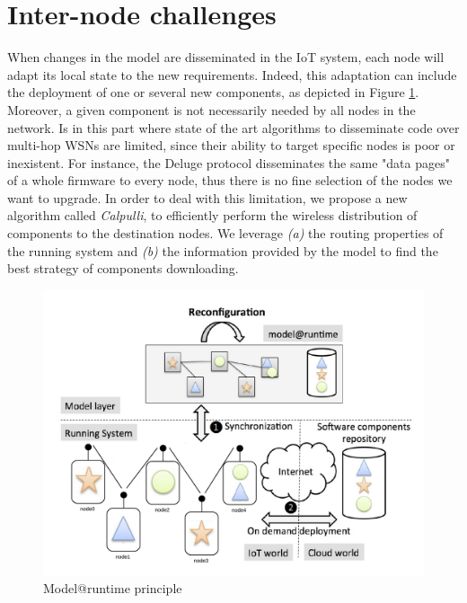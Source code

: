 \section{Inter-node challenges}
When changes in the model are disseminated in the IoT system, each node will adapt its local state to the new requirements. 
Indeed, this adaptation can include the deployment of one or several new components, as depicted in Figure \ref{fig:MAROverview2}. 
Moreover, a given component is not necessarily needed by all nodes in the network. 
Is in this part where state of the art algorithms to disseminate code over multi-hop WSNs are limited, since their ability to target specific nodes is poor or inexistent. 
For instance, the Deluge protocol \cite{hui2004dynamic} disseminates the same "data pages" of a whole firmware to every node, thus there is no fine selection of the nodes we want to upgrade. 
In order to deal with this limitation, we propose a new algorithm called \emph{Calpulli}, to efficiently perform the wireless distribution of components to the destination nodes. 
We leverage \textit{(a)} the routing properties of the running system and \textit{(b)} the information provided by the model to find the best strategy of components downloading.

\begin{figure}[htb]
	\centering
	\includegraphics[width=0.95\columnwidth]{chapters/calpulli.images/MAR_Overview2.pdf}
	\caption{Model@runtime principle} \label{fig:MAROverview2}
\end{figure}


